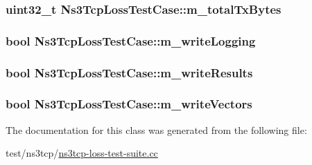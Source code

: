 \subsubsection[{\texorpdfstring{m\+\_\+total\+Tx\+Bytes}{m_totalTxBytes}}]{\setlength{\rightskip}{0pt plus 5cm}uint32\+\_\+t Ns3\+Tcp\+Loss\+Test\+Case\+::m\+\_\+total\+Tx\+Bytes\hspace{0.3cm}{\ttfamily [private]}}\hypertarget{classNs3TcpLossTestCase_ac06e95861fbb4ed79486d76a752a83d9}{}\label{classNs3TcpLossTestCase_ac06e95861fbb4ed79486d76a752a83d9}
\subsubsection[{\texorpdfstring{m\+\_\+write\+Logging}{m_writeLogging}}]{\setlength{\rightskip}{0pt plus 5cm}bool Ns3\+Tcp\+Loss\+Test\+Case\+::m\+\_\+write\+Logging\hspace{0.3cm}{\ttfamily [private]}}\hypertarget{classNs3TcpLossTestCase_a997665c1cf58a436a45b9e27766dd006}{}\label{classNs3TcpLossTestCase_a997665c1cf58a436a45b9e27766dd006}
\subsubsection[{\texorpdfstring{m\+\_\+write\+Results}{m_writeResults}}]{\setlength{\rightskip}{0pt plus 5cm}bool Ns3\+Tcp\+Loss\+Test\+Case\+::m\+\_\+write\+Results\hspace{0.3cm}{\ttfamily [private]}}\hypertarget{classNs3TcpLossTestCase_a8fe8477271a2be320b5111feeea6a9e8}{}\label{classNs3TcpLossTestCase_a8fe8477271a2be320b5111feeea6a9e8}
\subsubsection[{\texorpdfstring{m\+\_\+write\+Vectors}{m_writeVectors}}]{\setlength{\rightskip}{0pt plus 5cm}bool Ns3\+Tcp\+Loss\+Test\+Case\+::m\+\_\+write\+Vectors\hspace{0.3cm}{\ttfamily [private]}}\hypertarget{classNs3TcpLossTestCase_a6b4ff8445b57a44939392bb79b00d963}{}\label{classNs3TcpLossTestCase_a6b4ff8445b57a44939392bb79b00d963}


The documentation for this class was generated from the following file\+:\begin{DoxyCompactItemize}
\item 
test/ns3tcp/\hyperlink{ns3tcp-loss-test-suite_8cc}{ns3tcp-\/loss-\/test-\/suite.\+cc}\end{DoxyCompactItemize}
